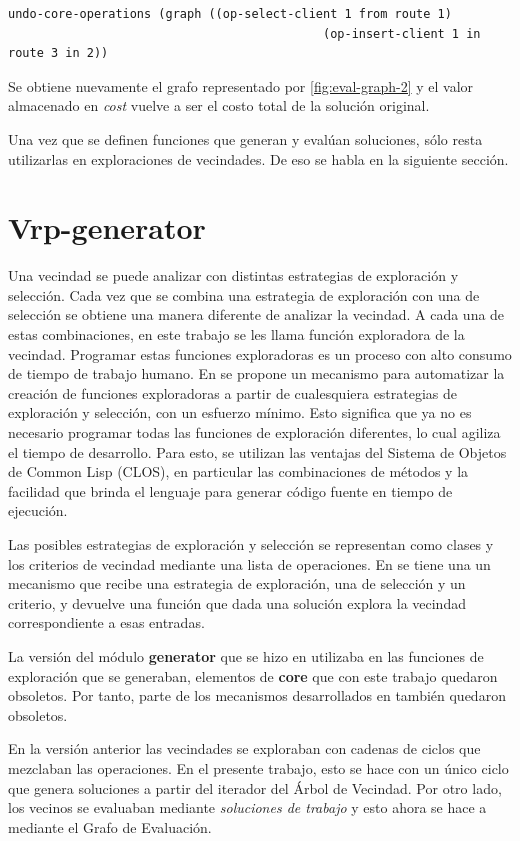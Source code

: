 \begin{lstlisting}
undo-core-operations (graph ((op-select-client 1 from route 1)
											(op-insert-client 1 in route 3 in 2))
\end{lstlisting}

Se obtiene nuevamente el grafo representado por \ref{fig:eval-graph-2} y el valor almacenado en \textit{cost} vuelve a ser el costo total de la solución original.

Una vez que se definen funciones que generan y evalúan soluciones, sólo resta utilizarlas en exploraciones de vecindades. De eso se habla en la siguiente sección.

\section{Vrp-generator}\label{2-blueprint}
Una vecindad se puede analizar con distintas estrategias de exploración y selección. Cada vez que se combina una estrategia de exploración con una de selección se obtiene una manera diferente de analizar la vecindad. A cada una de estas combinaciones, en este trabajo se les llama función exploradora de la vecindad. Programar estas funciones exploradoras es un proceso con alto consumo de tiempo de trabajo humano. En \cite{Heidy} se propone un mecanismo para automatizar la creación de funciones exploradoras a partir de cualesquiera estrategias de exploración y selección, con un esfuerzo mínimo. Esto significa que ya no es necesario programar todas las funciones de exploración diferentes, lo cual agiliza el tiempo de desarrollo. Para esto, se utilizan las ventajas del Sistema de Objetos de Common Lisp (CLOS), en particular las combinaciones de métodos y la facilidad que brinda el lenguaje para generar código fuente en tiempo de ejecución.

Las posibles estrategias de exploración y selección se representan como clases y los criterios de vecindad mediante una lista de operaciones. En \cite{Heidy} se tiene una un mecanismo que recibe una estrategia de exploración, una de selección y un criterio, y devuelve una función que dada una solución explora la vecindad correspondiente a esas entradas.

La versión del módulo \textbf{generator} que se hizo en \cite{Heidy} utilizaba en las funciones de exploración que se generaban, elementos de \textbf{core} que con este trabajo quedaron obsoletos. Por tanto, parte de los mecanismos desarrollados en \cite{Heidy} también quedaron obsoletos.

En la versión anterior las vecindades se exploraban con cadenas de ciclos que mezclaban las operaciones. En el presente trabajo, esto se hace con un único ciclo que genera soluciones a partir del iterador del Árbol de Vecindad. Por otro lado, los vecinos se evaluaban mediante \textit{soluciones de trabajo} y esto ahora se hace a mediante el Grafo de Evaluación.

